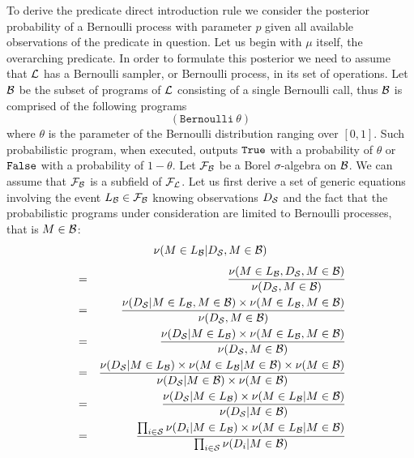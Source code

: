 \documentclass[]{article}
\begin{document}
To derive the predicate direct introduction rule we consider the
posterior probability of a Bernoulli process with parameter $p$ given
all available observations of the predicate in question.  Let us begin
with $\mu$ itself, the overarching predicate.  In order to formulate
this posterior we need to assume that $\mathcal{L}$ has a Bernoulli
sampler, or Bernoulli process, in its set of operations.  Let
$\mathcal{B}$ be the subset of programs of $\mathcal{L}$ consisting of a
single Bernoulli call, thus $\mathcal{B}$ is comprised of the following
programs
$$(\texttt{Bernoulli}\ \theta)$$ where $\theta$ is the parameter of
the Bernoulli distribution ranging over $[0, 1]$.  Such probabilistic
program, when executed, outputs $\texttt{True}$ with a probability of $\theta$
or $\texttt{False}$ with a probability of $1 - \theta$.  Let
$\mathcal{F}_{\mathcal{B}}$ be a Borel $\sigma$-algebra on $\mathcal{B}$.  We
can assume that $\mathcal{F}_{\mathcal{B}}$ is a subfield of
$\mathcal{F}_{\mathcal{L}}$.  Let us first derive a set of generic equations
involving the event $L_{\mathcal{B}} \in \mathcal{F}_{\mathcal{B}}$ knowing
observations $D_{\mathcal{S}}$ and the fact that the probabilistic programs
under consideration are limited to Bernoulli processes, that is $M \in
\mathcal{B}$:
$$\nu(M \in L_{\mathcal{B}} | D_{\mathcal{S}}, M \in \mathcal{B})$$
\begin{eqnarray}
  & = &
  \frac{\nu(M \in L_{\mathcal{B}}, D_{\mathcal{S}}, M \in \mathcal{B})}
       {\nu(D_{\mathcal{S}}, M \in \mathcal{B})} \label{eq:nubercond}\\
  & = &
  \frac{\nu(D_{\mathcal{S}} | M \in L_{\mathcal{B}}, M \in \mathcal{B})
        \times \nu(M \in L_{\mathcal{B}}, M \in \mathcal{B})}
       {\nu(D_{\mathcal{S}}, M \in \mathcal{B})} \label{eq:nubercondnum}\\
  & = &
  \frac{\nu(D_{\mathcal{S}} | M \in L_{\mathcal{B}})
        \times \nu(M \in L_{\mathcal{B}}, M \in \mathcal{B})}
       {\nu(D_{\mathcal{S}}, M \in \mathcal{B})} \label{eq:nubermarkov}\\
  & = &
  \frac{\nu(D_{\mathcal{S}} | M \in L_{\mathcal{B}})
        \times \nu(M \in L_{\mathcal{B}} | M \in \mathcal{B})
        \times \nu(M \in \mathcal{B})}
       {\nu(D_{\mathcal{S}} | M \in \mathcal{B}) \times \nu(M \in \mathcal{B})}
       \label{eq:nubercondsubnum}\\
  & = &
  \frac{\nu(D_{\mathcal{S}} | M \in L_{\mathcal{B}})
        \times \nu(M \in L_{\mathcal{B}} | M \in \mathcal{B})}
       {\nu(D_{\mathcal{S}} | M \in \mathcal{B})} \label{eq:nubersmplf}\\
  & = &
  \frac{\prod_{i\in \mathcal{S}} \nu(D_{i} | M \in L_{\mathcal{B}})
        \times \nu(M \in L_{\mathcal{B}} | M \in \mathcal{B})}
       {\prod_{i\in \mathcal{S}} \nu(D_{i} | M \in \mathcal{B})}
       \label{eq:nuberiid}
\end{eqnarray}
\end{document}

